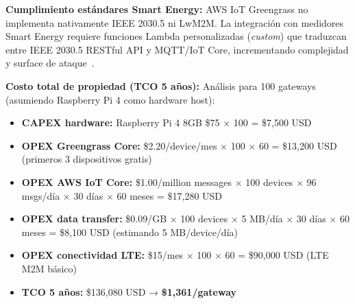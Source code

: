 \textbf{Cumplimiento estándares Smart Energy:} AWS IoT Greengrass no implementa nativamente IEEE 2030.5 ni LwM2M. La integración con medidores Smart Energy requiere funciones Lambda personalizadas (\textit{custom}) que traduzcan entre IEEE 2030.5 RESTful API y MQTT/IoT Core, incrementando complejidad y surface de ataque~\cite{awsAWSIoTSmartEnergy2023}.

\textbf{Costo total de propiedad (TCO 5 años):} Análisis para 100 gateways (asumiendo Raspberry Pi 4 como hardware host):

\begin{itemize}
\item \textbf{CAPEX hardware:} Raspberry Pi 4 8GB \$75 $\times$ 100 = \$7,500 USD
\item \textbf{OPEX Greengrass Core:} \$2.20/device/mes $\times$ 100 $\times$ 60 = \$13,200 USD (primeros 3 dispositivos gratis)
\item \textbf{OPEX AWS IoT Core:} \$1.00/million messages $\times$ 100 devices $\times$ 96 msgs/día $\times$ 30 días $\times$ 60 meses = \$17,280 USD
\item \textbf{OPEX data transfer:} \$0.09/GB $\times$ 100 devices $\times$ 5 MB/día $\times$ 30 días $\times$ 60 meses = \$8,100 USD (estimando 5 MB/device/día)
\item \textbf{OPEX conectividad LTE:} \$15/mes $\times$ 100 $\times$ 60 = \$90,000 USD (LTE M2M básico)
\item \textbf{TCO 5 años:} \$136,080 USD → \textbf{\$1,361/gateway}
\end{itemize}

